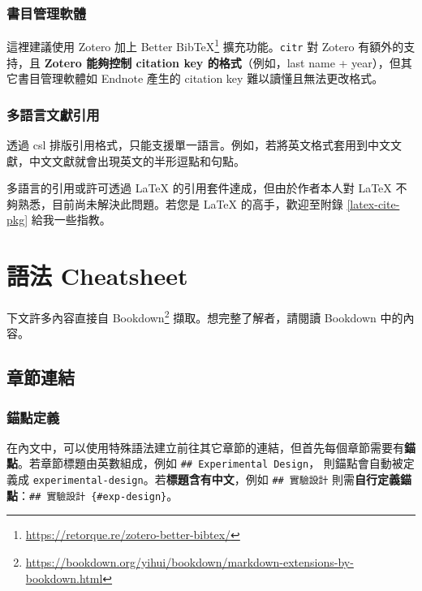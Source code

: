 \documentclass[oneside]{book}
\renewcommand{\href}[2]{#2\footnote{\url{#1}}}
\theoremstyle{definition}
\theoremstyle{definition}
\theoremstyle{definition}
\theoremstyle{remark}
\begin{document}
\hypertarget{ref-manager}{%
\subsection{書目管理軟體}\label{ref-manager}}

這裡建議使用 Zotero 加上 \href{https://retorque.re/zotero-better-bibtex/}{Better BibTeX} 擴充功能。\texttt{citr} 對 Zotero 有額外的支持，且 \textbf{Zotero 能夠控制 citation key 的格式}（例如，last name + year），但其它書目管理軟體如 Endnote 產生的 citation key 難以讀懂且無法更改格式。

\hypertarget{multi-lang-cite}{%
\subsection{多語言文獻引用}\label{multi-lang-cite}}

透過 csl 排版引用格式，只能支援單一語言。例如，若將英文格式套用到中文文獻，中文文獻就會出現英文的半形逗點和句點。

多語言的引用或許可透過 LaTeX 的引用套件達成，但由於作者本人對 LaTeX 不夠熟悉，目前尚未解決此問題。若您是 LaTeX 的高手，歡迎至附錄 \ref{latex-cite-pkg} 給我一些指教。

\hypertarget{cheatsheet}{%
\chapter{語法 Cheatsheet}\label{cheatsheet}}

下文許多內容直接自 \href{https://bookdown.org/yihui/bookdown/markdown-extensions-by-bookdown.html}{Bookdown} 擷取。想完整了解者，請閱讀 Bookdown 中的內容。

\hypertarget{chapter-cross-ref}{%
\section{章節連結}\label{chapter-cross-ref}}

\hypertarget{define-anchor}{%
\subsection{錨點定義}\label{define-anchor}}

在內文中，可以使用特殊語法建立前往其它章節的連結，但首先每個章節需要有\textbf{錨點}。若章節標題由英數組成，例如 \texttt{\#\#\ Experimental\ Design}， 則錨點會自動被定義成 \texttt{experimental-design}。若\textbf{標題含有中文}，例如 \texttt{\#\#\ 實驗設計} 則需\textbf{自行定義錨點}：\texttt{\#\#\ 實驗設計\ \{\#exp-design\}}。
\end{document}
